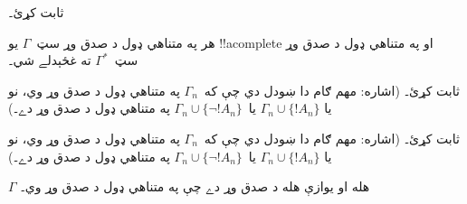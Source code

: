 \documentclass[../../../include/open-logic-section]{subfiles}
\begin{document}

\begin{prob}
 ثابت کړئ۔
\end{prob}
\tagendprob

\begin{lem}
 هر په متناهي ډول د صدق وړ سټ~$\Gamma$
يو !!a{complete} او په متناهي ډول د صدق وړ سټ~$\Gamma^*$ ته
غځېدلے شي۔
\end{lem}

\begin{prob}
 ثابت کړئ۔ (اشاره: مهم
ګام دا ښودل دي چې که~$\Gamma_n$ په متناهي ډول د صدق وړ وي، نو يا
$\Gamma_n \cup \{!A_n\}$ يا~$\Gamma_n \cup \{\lnot !A_n\}$ په
متناهي ډول د صدق وړ دے۔)
\end{prob}
\tagendprob

\begin{prob}
 ثابت کړئ۔ (اشاره: مهم
ګام دا ښودل دي چې که~$\Gamma_n$ په متناهي ډول د صدق وړ وي، نو يا
$\Gamma_n \cup \{!A_n\}$ يا~$\Gamma_n \cup \{\lnot !A_n\}$ په
متناهي ډول د صدق وړ دے۔)
\end{prob}
\tagendprob

\begin{thm}
 $\Gamma$ هله او يوازې هله د صدق
وړ دے چې په متناهي ډول د صدق وړ وي۔
\end{thm}
\end{document}
